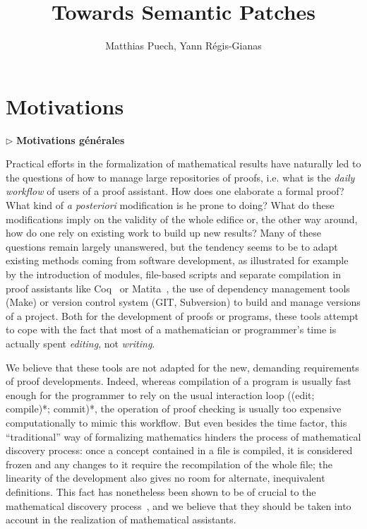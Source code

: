 \documentclass{article}
\title{Towards Semantic Patches}
\author{Matthias Puech, Yann Régis-Gianas}
\date{}
\newcommand{\remplan}[1]{\noindent\textcolor{bwblue}{$\triangleright$ \textbf{#1}}}
\begin{document}
\maketitle

\section{Motivations}

\remplan{Motivations générales}

Practical efforts in the formalization of mathematical results have
naturally led to the questions of how to manage large repositories of
proofs, i.e. what is the \emph{daily workflow} of users of a proof
assistant. How does one elaborate a formal proof? What kind of \emph{a
  posteriori} modification is he prone to doing? What do these
modifications imply on the validity of the whole edifice or, the other
way around, how do one rely on existing work to build up new results?
Many of these questions remain largely unanswered, but the tendency
seems to be to adapt existing methods coming from software
development, as illustrated for example by the introduction of
modules, file-based scripts and separate compilation in proof
assistants like \textsf{Coq}~{\cite{CoqDocWeb}} or
\textsf{Matita}~{\cite{Asperti06userinteraction}}, the use of
dependency management tools (\textsf{Make}) or version control system
(\textsf{GIT}, \textsf{Subversion}) to build and manage versions of a
project. Both for the development of proofs or programs, these tools
attempt to cope with the fact that most of a mathematician or
programmer's time is actually spent \emph{editing}, not
\emph{writing}.

We believe that these tools are not adapted for the new, demanding
requirements of proof developments. Indeed, whereas compilation of a
program is usually fast enough for the programmer to rely on the usual
interaction loop ((edit; compile)*; commit)*, the operation of proof
checking is usually too expensive computationally to mimic this
workflow. But even besides the time factor, this ``traditional'' way
of formalizing mathematics hinders the process of mathematical
discovery process: once a concept contained in a file is compiled, it
is considered frozen and any changes to it require the recompilation
of the whole file; the linearity of the development also gives no room
for alternate, inequivalent definitions. This fact has nonetheless
been shown to be of crucial to the mathematical discovery
process~\cite{lakatos1964proofs}, and we believe that they should be
taken into account in the realization of mathematical assistants.
\end{document}
